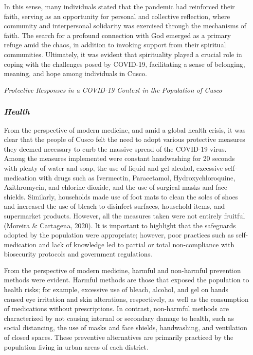 \documentclass{article}
\begin{document}
In this sense, many individuals stated that the pandemic had reinforced their faith, serving as an opportunity for personal and collective reflection, where community and interpersonal solidarity was exercised through the mechanisms of faith. The search for a profound connection with God emerged as a primary refuge amid the chaos, in addition to invoking support from their spiritual communities. Ultimately, it was evident that spirituality played a crucial role in coping with the challenges posed by COVID-19, facilitating a sense of belonging, meaning, and hope among individuals in Cusco.

\textit{Protective Responses in a COVID-19 Context in the Population of Cusco}

\subsubsection{\textit{Health}}

From the perspective of modern medicine, and amid a global health crisis, it was clear that the people of Cusco felt the need to adopt various protective measures they deemed necessary to curb the massive spread of the COVID-19 virus. Among the measures implemented were constant handwashing for 20 seconds with plenty of water and soap, the use of liquid and gel alcohol, excessive self-medication with drugs such as Ivermectin, Paracetamol, Hydroxychloroquine, Azithromycin, and chlorine dioxide, and the use of surgical masks and face shields. Similarly, households made use of foot mats to clean the soles of shoes and increased the use of bleach to disinfect surfaces, household items, and supermarket products. However, all the measures taken were not entirely fruitful (Moreira \& Cartagena, 2020). It is important to highlight that the safeguards adopted by the population were appropriate; however, poor practices such as self-medication and lack of knowledge led to partial or total non-compliance with biosecurity protocols and government regulations.

From the perspective of modern medicine, harmful and non-harmful prevention methods were evident. Harmful methods are those that exposed the population to health risks; for example, excessive use of bleach, alcohol, and gel on hands caused eye irritation and skin alterations, respectively, as well as the consumption of medications without prescriptions. In contrast, non-harmful methods are characterized by not causing internal or secondary damage to health, such as social distancing, the use of masks and face shields, handwashing, and ventilation of closed spaces. These preventive alternatives are primarily practiced by the population living in urban areas of each district.
\end{document}
